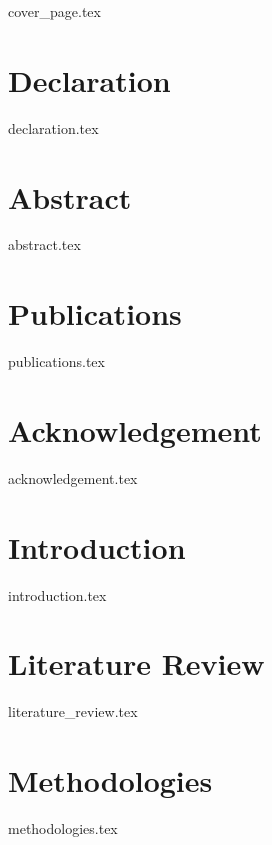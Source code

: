 \documentclass[a4paper, 12pt, oneside]{book}
\begin{document}
\frontmatter
{cover_page.tex}


\chapter*{Declaration}
{declaration.tex}

\chapter*{Abstract}
{abstract.tex}

\chapter*{Publications}
{publications.tex}

\chapter*{Acknowledgement}
{acknowledgement.tex}

{  %

\tableofcontents

\listoffigures

\listoftables

\printglossary[type=\acronymtype,nonumberlist, style=super
]
}

\mainmatter


\chapter{Introduction}
{introduction.tex}

\chapter{Literature Review}
{literature_review.tex}

\chapter{Methodologies}
{methodologies.tex}
\end{document}
